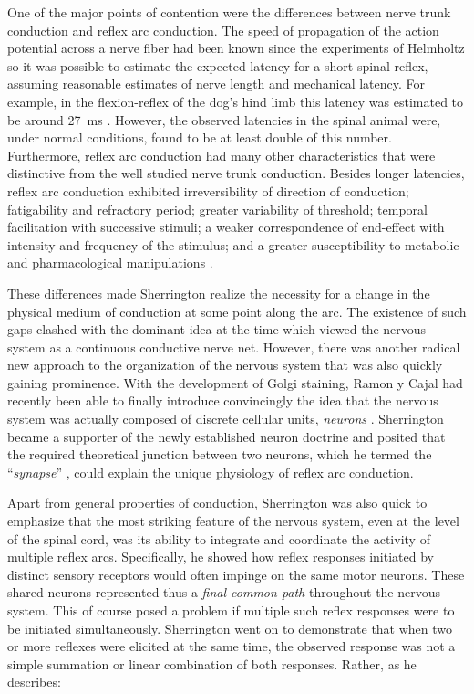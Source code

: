 One of the major points of contention were the differences between nerve trunk conduction and reflex arc conduction. The speed of propagation of the action potential across a nerve fiber had been known since the experiments of Helmholtz \cite{Helmholtz1850,Schmidgen2002} so it was possible to estimate the expected latency for a short spinal reflex, assuming reasonable estimates of nerve length and mechanical latency. For example, in the flexion-reflex of the dog's hind limb this latency was estimated to be around \SI{27}{\milli\second} \cite[p.19]{Sherrington1906}. However, the observed latencies in the spinal animal were, under normal conditions, found to be at least double of this number. Furthermore, reflex arc conduction had many other characteristics that were distinctive from the well studied nerve trunk conduction. Besides longer latencies, reflex arc conduction exhibited irreversibility of direction of conduction; fatigability and refractory period; greater variability of threshold; temporal facilitation with successive stimuli; a weaker correspondence of end-effect with intensity and frequency of the stimulus; and a greater susceptibility to metabolic and pharmacological manipulations \cite[p.14]{Sherrington1906}.

These differences made Sherrington realize the necessity for a change in the physical medium of conduction at some point along the arc. The existence of such gaps clashed with the dominant idea at the time which viewed the nervous system as a continuous conductive nerve net. However, there was another radical new approach to the organization of the nervous system that was also quickly gaining prominence. With the development of Golgi staining, Ramon y Cajal had recently been able to finally introduce convincingly the idea that the nervous system was actually composed of discrete cellular units, \emph{neurons} \cite{RamonYCajal1894}. Sherrington became a supporter of the newly established neuron doctrine and posited that the required theoretical junction between two neurons, which he termed the ``\emph{synapse}'' \cite{Foster1897}, could explain the unique physiology of reflex arc conduction.

Apart from general properties of conduction, Sherrington was also quick to emphasize that the most striking feature of the nervous system, even at the level of the spinal cord, was its ability to integrate and coordinate the activity of multiple reflex arcs. Specifically, he showed how reflex responses initiated by distinct sensory receptors would often impinge on the same motor neurons. These shared neurons represented thus a \emph{final common path} \cite{Sherrington1904} throughout the nervous system. This of course posed a problem if multiple such reflex responses were to be initiated simultaneously. Sherrington went on to demonstrate that when two or more reflexes were elicited at the same time, the observed response was not a simple summation or linear combination of both responses. Rather, as he describes:

